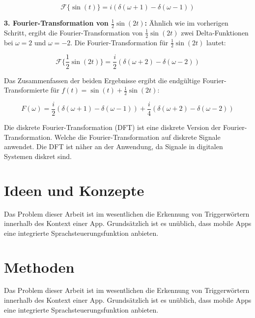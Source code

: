 \documentclass[11pt,a4paper]{article}
\begin{document}
\begin{equation*}
\mathcal{F}\{\sin(t)\} = i \left( \delta(\omega + 1) - \delta(\omega - 1) \right)
\end{equation*}

\noindent
\newline
\textbf{3. Fourier-Transformation von \( \frac{1}{2}\sin(2t) \):}  
Ähnlich wie im vorherigen Schritt, ergibt die Fourier-Transformation von \( \frac{1}{2}\sin(2t) \) 
zwei Delta-Funktionen bei \( \omega = 2 \) und \( \omega = -2 \). Die Fourier-Transformation für 
\( \frac{1}{2}\sin(2t) \) lautet:

\begin{equation*}
\mathcal{F}\{\frac{1}{2}\sin(2t)\} = \frac{i}{2} \left( \delta(\omega + 2) - 
\delta(\omega - 2) \right)
\end{equation*}

\noindent
\newline
Das Zusammenfassen der beiden Ergebnisse ergibt die endgültige Fourier-Transformierte für 
\( f(t) = \sin(t) + \frac{1}{2}\sin(2t) \):

\begin{equation*}
F(\omega) = \frac{i}{2} \left( \delta(\omega + 1) - \delta(\omega - 1) \right) + 
\frac{i}{4} \left( \delta(\omega + 2) - \delta(\omega - 2) \right)
\end{equation*}


\noindent
\newline
Die diskrete Fourier-Transformation (DFT) ist eine diskrete Version der Fourier-Transformation.
Welche die Fourier-Transformation auf diskrete Signale anwendet. Die DFT ist näher an der
Anwendung, da Signale in digitalen Systemen diskret sind.








\newpage
\section{Ideen und Konzepte}
Das Problem dieser Arbeit ist im wesentlichen die Erkennung von Triggerwörtern innerhalb
des Kontext einer App. Grundsätzlich ist es unüblich, dass mobile Apps eine
integrierte Sprachsteuerungsfunktion anbieten.


\newpage
\section{Methoden}
Das Problem dieser Arbeit ist im wesentlichen die Erkennung von Triggerwörtern innerhalb
des Kontext einer App. Grundsätzlich ist es unüblich, dass mobile Apps eine
integrierte Sprachsteuerungsfunktion anbieten.
\end{document}
